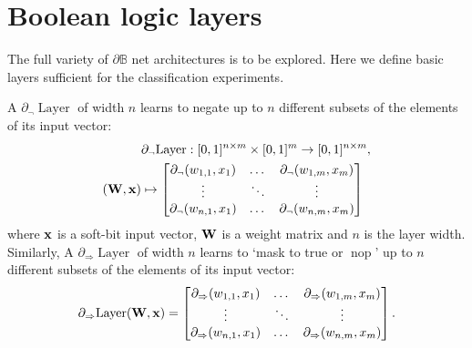 \documentclass{article}
\theoremstyle{plain}
\theoremstyle{definition}
\theoremstyle{remark}
\begin{document}
\newpage
\appendix
\onecolumn

\section{Boolean logic layers}\label{sec:layers}

The full variety of $\partial\mathbb{B}$ net architectures is to be explored. Here we define basic layers sufficient for the classification experiments.

A $\partial_{\neg} \!\operatorname{Layer}$ of width $n$ learns to negate up to $n$ different subsets of the elements of its input vector:
\begin{equation*}
\begin{aligned}
& \partial_{\neg} \!\operatorname{Layer}: [0,1]^{n \times m} \times [0,1]^{m} \to [0,1]^{n \times m}, \\
({\bf W}, {\bf x}) &\mapsto 
\begin{bmatrix}
\partial_{\neg}(w_{1,1}, x_{1}) & \dots & \partial_{\neg}(w_{1,m}, x_{m}) \\
\vdots & \ddots & \vdots \\
\partial_{\neg}(w_{n,1}, x_{1}) & \dots & \partial_{\neg}(w_{n,m}, x_{m})
\end{bmatrix}
\end{aligned}
\end{equation*}
where ${\bf x}$ is a soft-bit input vector, ${\bf W}$ is a weight matrix and $n$ is the layer width. Similarly, A $\partial_{\Rightarrow} \!\operatorname{Layer}$ of width $n$ learns to `mask to true or $\operatorname{nop}$' up to $n$ different subsets of the elements of its input vector:
\begin{equation*}
\partial_{\Rightarrow} \!\operatorname{Layer}({\bf W}, {\bf x}) =
\begin{bmatrix}
\partial_{\Rightarrow}(w_{1,1}, x_{1}) & \dots & \partial_{\Rightarrow}(w_{1,m}, x_{m}) \\
\vdots & \ddots & \vdots \\
\partial_{\Rightarrow}(w_{n,1}, x_{1}) & \dots & \partial_{\Rightarrow}(w_{n,m}, x_{m})
\end{bmatrix}\text{.}
\end{equation*}
\end{document}
